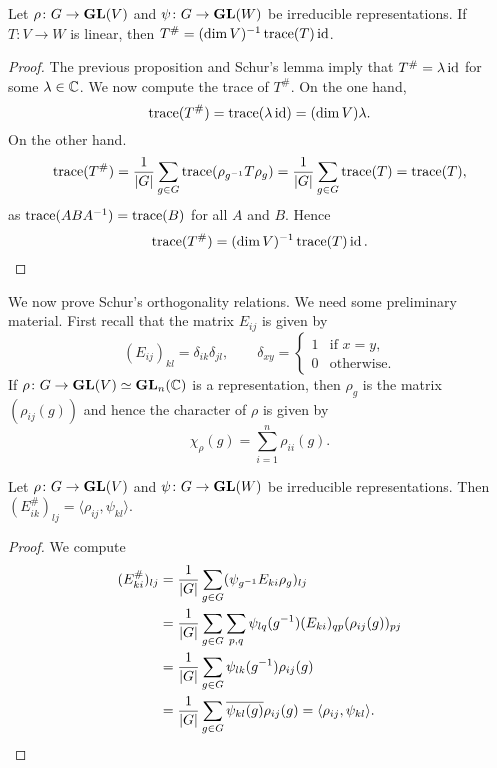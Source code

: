 \begin{theorem}
  Let $\rho\colon G\to\mathbf{GL}(V)$ and $\psi\colon G\to\mathbf{GL}(W)$ be irreducible representations. 
  If $T\colon V\to W$ is linear, then 
  $T^{\#}=(\dim V)^{-1}\operatorname{trace}(T)\operatorname{id}$.
\end{theorem}

\begin{proof}
  The previous proposition and Schur's lemma imply that
  $T^{\#}=\lambda\operatorname{id}$ for some $\lambda\in\mathbb{C}$.
  We now compute the trace of $T^{\#}$. On the one hand, 
  \[
	\operatorname{trace}(T^{\#})=\operatorname{trace}(\lambda\operatorname{id})=(\dim V)\lambda.
  \]
  On the other hand.  
  \[
	\operatorname{trace}(T^{\#})
	=\frac{1}{|G|}\sum_{g\in G}\operatorname{trace}(\rho_{g^{-1}}T\rho_g)
	=\frac{1}{|G|}\sum_{g\in G}\operatorname{trace}(T)
	=\operatorname{trace}(T),
  \]
  as $\operatorname{trace}(ABA^{-1})=\operatorname{trace}(B)$ for all $A$ and $B$. 
  Hence 
  \[
  \operatorname{trace}(T^{\#})=(\dim V)^{-1}\operatorname{trace}(T)\operatorname{id}.\qedhere 
  \]
\end{proof}

We now prove Schur's orthogonality relations. We need some preliminary material. First recall that 
the matrix $E_{ij}$ is given by 
\[
(E_{ij})_{kl}=\delta_{ik}\delta_{jl},
\qquad
\delta_{xy}=\begin{cases}
    1 & \text{if $x=y$},\\
    0 & \text{otherwise}.
\end{cases}
\]
If $\rho\colon G\to\mathbf{GL}(V)\simeq\mathbf{GL}_n(\mathbb{C})$ is a representation, then
$\rho_g$ is the matrix $(\rho_{ij}(g))$ and hence the character of $\rho$ is given by
\[
\chi_\rho(g)=\sum_{i=1}^n\rho_{ii}(g).
\]

\begin{lemma}
Let $\rho\colon G\to\mathbf{GL}(V)$ and $\psi\colon G\to\mathbf{GL}(W)$ be irreducible representations. Then
$(E_{ik}^\#)_{lj}=\langle\rho_{ij},\psi_{kl}\rangle$.
\end{lemma}

\begin{proof}
  We compute
  \begin{align*}
      (E_{ki}^\#)_{lj} &= \frac{1}{|G|}\sum_{g\in G}(\psi_{g^{-1}}E_{ki}\rho_g)_{lj}\\
      &=\frac{1}{|G|}\sum_{g\in G}\sum_{p,q}\psi_{lq}(g^{-1})(E_{ki})_{qp}(\rho_{ij}(g))_{pj}\\
      &=\frac{1}{|G|}\sum_{g\in G}\psi_{lk}(g^{-1})\rho_{ij}(g)\\
      &=\frac{1}{|G|}\sum_{g\in G}\overline{\psi_{kl}(g)}\rho_{ij}(g)=\langle \rho_{ij},\psi_{kl}\rangle.\qedhere
  \end{align*}
\end{proof}

